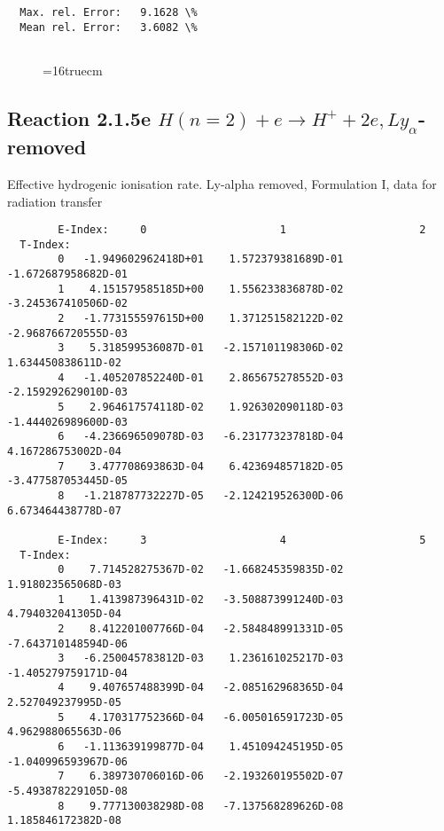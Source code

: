 \documentclass[12pt,dvipdfmx]{article}
\begin{document}
\begin{small}
\begin{verbatim}
  Max. rel. Error:   9.1628 \%
  Mean rel. Error:   3.6082 \%


\end{verbatim}\end{small}
\begin{figure} \label{2.1.5d}
\epsfxsize=16truecm
\end{figure}
\newpage
\subsection{
Reaction 2.1.5e  $H(n=2) + e \rightarrow H^+ + 2e, Ly_\alpha$-removed
}


   Effective hydrogenic ionisation rate.
   Ly-alpha removed, Formulation I, data for radiation transfer

\begin{small}\begin{verbatim}
        E-Index:     0                     1                     2
  T-Index:
        0   -1.949602962418D+01    1.572379381689D-01   -1.672687958682D-01
        1    4.151579585185D+00    1.556233836878D-02   -3.245367410506D-02
        2   -1.773155597615D+00    1.371251582122D-02   -2.968766720555D-03
        3    5.318599536087D-01   -2.157101198306D-02    1.634450838611D-02
        4   -1.405207852240D-01    2.865675278552D-03   -2.159292629010D-03
        5    2.964617574118D-02    1.926302090118D-03   -1.444026989600D-03
        6   -4.236696509078D-03   -6.231773237818D-04    4.167286753002D-04
        7    3.477708693863D-04    6.423694857182D-05   -3.477587053445D-05
        8   -1.218787732227D-05   -2.124219526300D-06    6.673464438778D-07

        E-Index:     3                     4                     5
  T-Index:
        0    7.714528275367D-02   -1.668245359835D-02    1.918023565068D-03
        1    1.413987396431D-02   -3.508873991240D-03    4.794032041305D-04
        2    8.412201007766D-04   -2.584848991331D-05   -7.643710148594D-06
        3   -6.250045783812D-03    1.236161025217D-03   -1.405279759171D-04
        4    9.407657488399D-04   -2.085162968365D-04    2.527049237995D-05
        5    4.170317752366D-04   -6.005016591723D-05    4.962988065563D-06
        6   -1.113639199877D-04    1.451094245195D-05   -1.040996593967D-06
        7    6.389730706016D-06   -2.193260195502D-07   -5.493878229105D-08
        8    9.777130038298D-08   -7.137568289626D-08    1.185846172382D-08


\end{verbatim}
\end{small}
\end{document}
